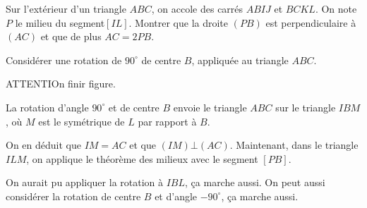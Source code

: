 \begin{exo}%
Sur l'extérieur d'un triangle $ABC$, on accole des carrés $ABIJ$ et $BCKL$.
On note $P$ le milieu du segment$[IL]$.
Montrer que la droite $(PB)$ est perpendiculaire à $(AC)$ et que de plus $AC=2PB$.
\begin{center}
\end{center}
\begin{hint}
Considérer une rotation de $90^\circ$ de centre $B$, appliquée au triangle $ABC$.
\end{hint}
\begin{sol}
ATTENTIOn finir figure.


La rotation d'angle $90^\circ$ et de centre $B$ envoie le triangle $ABC$ sur le triangle $IBM$, où $M$ est le symétrique de $L$ par rapport à $B$.

On en déduit que $IM=AC$ et que $(IM)\bot(AC)$.
Maintenant, dans le triangle $ILM$, on applique le théorème des milieux avec le segment $[PB]$.

On aurait pu appliquer la rotation à $IBL$, ça marche aussi.
On peut aussi considérer la rotation de centre $B$ et d'angle $-90^\circ$, ça marche aussi.
\end{sol}
\end{exo}


